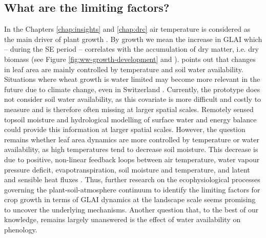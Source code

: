 \subsection{What are the limiting factors?}
In the Chapters \ref{chap:insights} and \ref{chap:drc} air temperature is considered as the main driver of plant growth \citep{porter_temperatures_1999}. By growth we mean the increase in \gls{GLAI} which -- during the \gls{SE} period -- correlates with the accumulation of dry matter, i.e. dry biomass (see Figure \ref{fig:ww-growth-development} and \cite{aase_relationship_1978}). \cite{monteith_climate_1977} points out that changes in leaf area are mainly controlled by temperature and soil water availability. Situations where wheat growth is water limited may become more relevant in the future due to climate change, even in Switzerland \citep{holzkamper_spatial_2015}. Currently, the prototype does not consider soil water availability, as this covariate is more difficult and costly to measure and is therefore often missing at larger spatial scales. Remotely sensed topsoil moisture \citep{lobell_moisture_2002, sadeghi_optical_2017} and hydrological modelling of surface water and energy balance \citep{penman_natural_1948, priestley_assessment_1972, shuttleworth_simplified_1978} could provide this information at larger spatial scales. However, the question remains whether leaf area dynamics are more controlled by temperature or water availability, as high temperatures tend to decrease soil moisture. This decrease is due to positive, non-linear feedback loops between air temperature, water vapour pressure deficit, evapotranspiration, soil moisture and temperature, and latent and sensible heat fluxes \citep{webber_diverging_2018, garcia-garcia_soil_2023}. Thus, further research on the ecophysiological processes governing the plant-soil-atmosphere continuum to identify the limiting factors for crop growth in terms of \gls{GLAI} dynamics at the landscape scale seems promising to uncover the underlying mechanisms. Another question that, to the best of our knowledge, remains largely unanswered is the effect of water availability on phenology.

